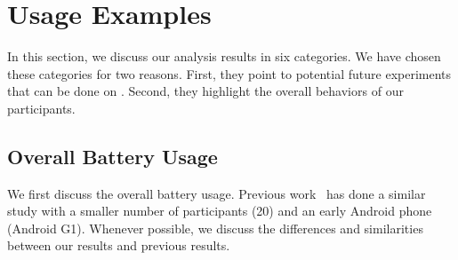 \section{Usage Examples}
\label{sec-usage}

In this section, we discuss our analysis results in six categories. We have
chosen these categories for two reasons. First, they point to potential future
experiments that can be done on \PhoneLab{}. Second, they highlight the overall
behaviors of our participants.

\subsection{Overall Battery Usage}
\label{subsec-batteryoverview}

We first discuss the overall battery usage. Previous
work~\cite{shye:micro:2009} has done a similar study with a smaller number of
participants (20) and an early Android phone (Android G1). Whenever possible, we
discuss the differences and similarities between our results and previous
results.
